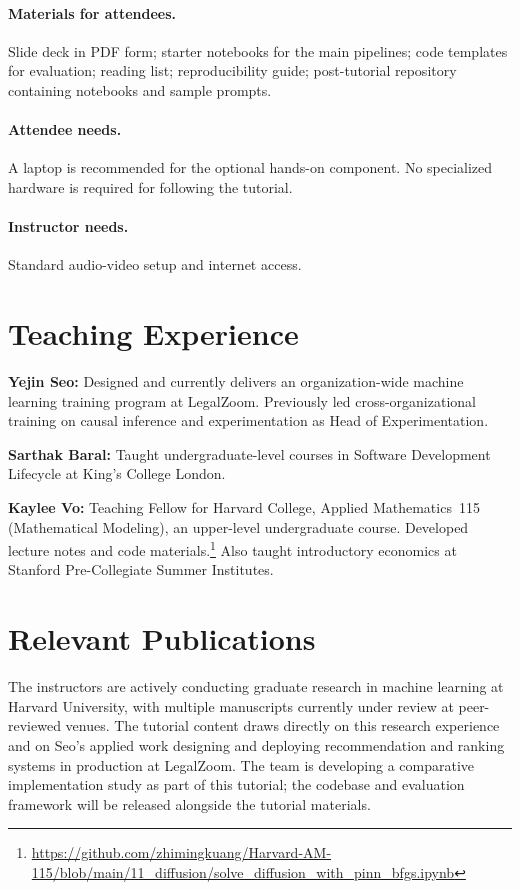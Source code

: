 \documentclass[sigconf,nonacm]{acmart}
\begin{document}
\paragraph{Materials for attendees.}
Slide deck in PDF form; starter notebooks for the main pipelines; code templates for evaluation; reading list; reproducibility guide; post-tutorial repository containing notebooks and sample prompts.

\paragraph{Attendee needs.}
A laptop is recommended for the optional hands-on component.
No specialized hardware is required for following the tutorial.

\paragraph{Instructor needs.}
Standard audio-video setup and internet access.

\section{Teaching Experience}
\textbf{Yejin Seo:} Designed and currently delivers an organization-wide machine learning training program at LegalZoom.
Previously led cross-organizational training on causal inference and experimentation as Head of Experimentation.

\textbf{Sarthak Baral:} Taught undergraduate-level courses in Software Development Lifecycle at King's College London.

\textbf{Kaylee Vo:} Teaching Fellow for Harvard College, Applied Mathematics~115 (Mathematical Modeling), an upper-level undergraduate course.
Developed lecture notes and code materials.\footnote{\url{https://github.com/zhimingkuang/Harvard-AM-115/blob/main/11_diffusion/solve_diffusion_with_pinn_bfgs.ipynb}}
Also taught introductory economics at Stanford Pre-Collegiate Summer Institutes.

\section{Relevant Publications}
The instructors are actively conducting graduate research in machine learning at Harvard University, with multiple manuscripts currently under review at peer-reviewed venues.
The tutorial content draws directly on this research experience and on Seo's applied work designing and deploying recommendation and ranking systems in production at LegalZoom.
The team is developing a comparative implementation study as part of this tutorial; the codebase and evaluation framework will be released alongside the tutorial materials.
\end{document}
